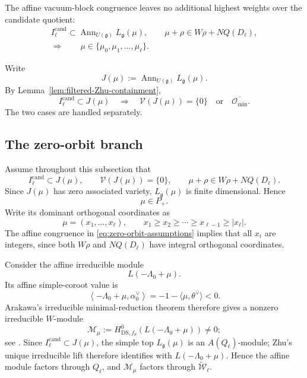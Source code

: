 \documentclass[11pt]{amsart}
\theoremstyle{remark}
\numberwithin{equation}{section}
\begin{document}
The affine vacuum-block congruence leaves no additional highest weights over
the candidate quotient:
\begin{equation}
\begin{gathered}
   I_\ell^{\mathrm{cand}}
   \subset
   \operatorname{Ann}_{U(\mathfrak g)}L_{\mathfrak g}(\mu),
   \qquad
   \mu+\rho\in W\rho+NQ(D_\ell),\\
   \Longrightarrow\qquad
   \mu\in\{\mu_0,\mu_1,\ldots,\mu_\ell\}.
\end{gathered}
\end{equation}

Write
\[
   J(\mu):=
   \operatorname{Ann}_{U(\mathfrak g)}L_{\mathfrak g}(\mu).
\]
By Lemma~\ref{lem:filtered-Zhu-containment},
\[
   I_\ell^{\mathrm{cand}}\subset J(\mu)
   \quad\Longrightarrow\quad
   \mathcal V(J(\mu))
   =
   \{0\}
   \quad\text{or}\quad
   \overline{\mathcal O_{\min}}.
\]
The two cases are handled separately.

\subsection{The zero-orbit branch}

Assume throughout this subsection that
\begin{equation}
\label{eq:zero-orbit-assumptions}
   I_\ell^{\mathrm{cand}}\subset J(\mu),
   \qquad
   \mathcal V(J(\mu))=\{0\},
   \qquad
   \mu+\rho\in W\rho+NQ(D_\ell).
\end{equation}
Since \(J(\mu)\) has zero associated variety,
\(L_{\mathfrak g}(\mu)\) is finite dimensional.  Hence
\[
   \mu\in P_+.
\]
Write its dominant orthogonal coordinates as
\[
   \mu=(x_1,\ldots,x_\ell),
   \qquad
   x_1\ge x_2\ge\cdots\ge x_{\ell-1}\ge |x_\ell|.
\]
The affine congruence in \eqref{eq:zero-orbit-assumptions} implies that all
\(x_i\) are integers, since both \(W\rho\) and \(NQ(D_\ell)\) have integral
orthogonal coordinates.

Consider the affine irreducible module
\[
   L(-\Lambda_0+\mu).
\]
Its affine simple-coroot value is
\[
   \left\langle
      -\Lambda_0+\mu,\alpha_0^\vee
   \right\rangle
   =
   -1-\langle\mu,\theta^\vee\rangle<0.
\]
Arakawa's irreducible minimal-reduction theorem therefore gives a nonzero
irreducible \(W\)-module
\begin{equation}
   \mathcal M_\mu
   :=
   H^0_{\mathrm{DS},f_\theta}
   \!\left(
      L(-\Lambda_0+\mu)
   \right)
   \ne0;
\end{equation}
see \cite[Theorem~6.7.4]{Arakawa2005}.  Since
\(I_\ell^{\mathrm{cand}}\subset J(\mu)\), the simple top
\(L_{\mathfrak g}(\mu)\) is an \(A(Q_\ell)\)-module; Zhu's unique
irreducible lift \cite[Theorem~4.9]{DongLiMason1998} therefore identifies
with \(L(-\Lambda_0+\mu)\).  Hence the affine module factors through
\(Q_\ell\), and \(\mathcal M_\mu\) factors through
\(\widetilde{\mathcal W}_\ell\).
\end{document}
